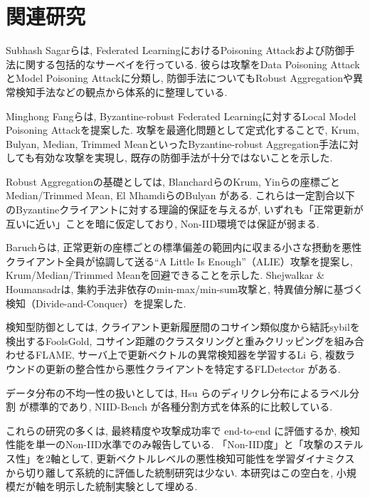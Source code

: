\documentclass[a4j, twocolumn, dvipdfmx]{jsarticle}
\begin{document}
\section{関連研究}

Subhash Sagarらは, Federated LearningにおけるPoisoning Attackおよび防御手法に関する包括的なサーベイを行っている. 彼らは攻撃をData Poisoning AttackとModel Poisoning Attackに分類し, 防御手法についてもRobust Aggregationや異常検知手法などの観点から体系的に整理している\cite{sagar2023survey}.

Minghong Fangらは, Byzantine-robust Federated Learningに対するLocal Model Poisoning Attackを提案した. 攻撃を最適化問題として定式化することで, Krum, Bulyan, Median, Trimmed MeanといったByzantine-robust Aggregation手法に対しても有効な攻撃を実現し, 既存の防御手法が十分ではないことを示した\cite{fang2020local}.

Robust Aggregationの基礎としては, BlanchardらのKrum\cite{blanchard2017krum}, Yinらの座標ごとMedian/Trimmed Mean\cite{yin2018byzantine}, El MhamdiらのBulyan\cite{elmhamdi2018hidden} がある. これらは一定割合以下のByzantineクライアントに対する理論的保証を与えるが, いずれも「正常更新が互いに近い」ことを暗に仮定しており, Non-IID環境では保証が弱まる.

Baruchらは, 正常更新の座標ごとの標準偏差の範囲内に収まる小さな摂動を悪性クライアント全員が協調して送る``A Little Is Enough''（ALIE）攻撃を提案し, Krum/Median/Trimmed Meanを回避できることを示した\cite{baruch2019little}. Shejwalkar \& Houmansadrは, 集約手法非依存のmin-max/min-sum攻撃と, 特異値分解に基づく検知（Divide-and-Conquer）を提案した\cite{shejwalkar2021manipulating}.

検知型防御としては, クライアント更新履歴間のコサイン類似度から結託sybilを検出するFoolsGold\cite{fung2020limitations}, コサイン距離のクラスタリングと重みクリッピングを組み合わせるFLAME\cite{nguyen2022flame}, サーバ上で更新ベクトルの異常検知器を学習するLi ら\cite{li2020learning}, 複数ラウンドの更新の整合性から悪性クライアントを特定するFLDetector\cite{zhang2022fldetector} がある.

データ分布の不均一性の扱いとしては, Hsu らのディリクレ分布によるラベル分割\cite{hsu2019measuring} が標準的であり, NIID-Bench\cite{li2022federated} が各種分割方式を体系的に比較している.

これらの研究の多くは, 最終精度や攻撃成功率で end-to-end に評価するか, 検知性能を単一のNon-IID水準でのみ報告している. 「Non-IID度」と「攻撃のステルス性」を2軸として, 更新ベクトルレベルの悪性検知可能性を学習ダイナミクスから切り離して系統的に評価した統制研究は少ない. 本研究はこの空白を, 小規模だが軸を明示した統制実験として埋める.
\end{document}
